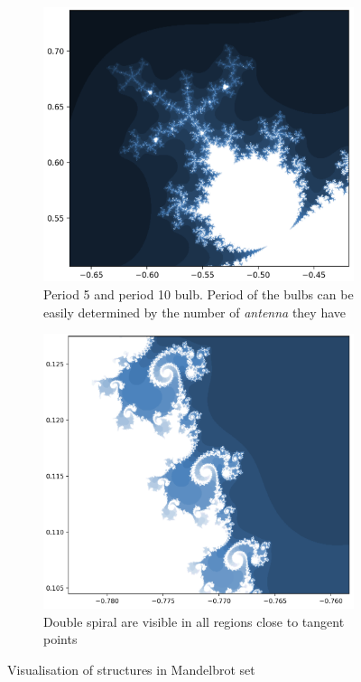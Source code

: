 \documentclass{article}
\begin{document}
    \begin{figure}[h]
        \begin{subfigure}[t]{.48\linewidth}
            \centering
            \includegraphics[width=.9\textwidth]{pictures/part_1/mandelbrot_set_bulbs_10_5.png}
            \caption{Period 5 and period 10 bulb. Period of the bulbs can be easily determined by the number of \emph{antenna} they have}
            \label{fig:mandelbrot_set_bulb_5_10}
        \end{subfigure}
        \begin{subfigure}[t]{.48\linewidth}
            \centering
            \includegraphics[width=.9\textwidth]{pictures/part_1/mandelbrot_set_spiral.png}
            \caption{Double spiral are visible in all regions close to tangent points}
            \label{fig:mandelbrot_double_spiral_seahorse_valley}
        \end{subfigure}
        \caption{Visualisation of structures in Mandelbrot set}
        \label{fig:mandelbrot_set_bulbs}
    \end{figure}
\end{document}
